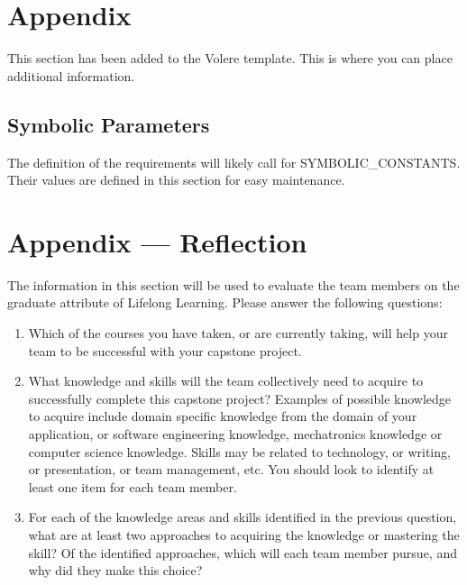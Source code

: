 \documentclass[12pt, titlepage]{article}
\begin{document}




\newpage

\section{Appendix}

This section has been added to the Volere template.  This is where you can place
additional information.

\subsection{Symbolic Parameters}

The definition of the requirements will likely call for SYMBOLIC\_CONSTANTS.
Their values are defined in this section for easy maintenance.

\section{Appendix --- Reflection}

The information in this section will be used to evaluate the team members on the
graduate attribute of Lifelong Learning.  Please answer the following questions:

\begin{enumerate}
  \item Which of the courses you have taken, or are currently taking, will help
  your team to be successful with your capstone project.
  \item What knowledge and skills will the team collectively need to acquire to
  successfully complete this capstone project?  Examples of possible knowledge
  to acquire include domain specific knowledge from the domain of your
  application, or software engineering knowledge, mechatronics knowledge or
  computer science knowledge.  Skills may be related to technology, or writing,
  or presentation, or team management, etc.  You should look to identify at
  least one item for each team member.
  \item For each of the knowledge areas and skills identified in the previous
  question, what are at least two approaches to acquiring the knowledge or
  mastering the skill?  Of the identified approaches, which will each team
  member pursue, and why did they make this choice?
\end{enumerate}
\end{document}
